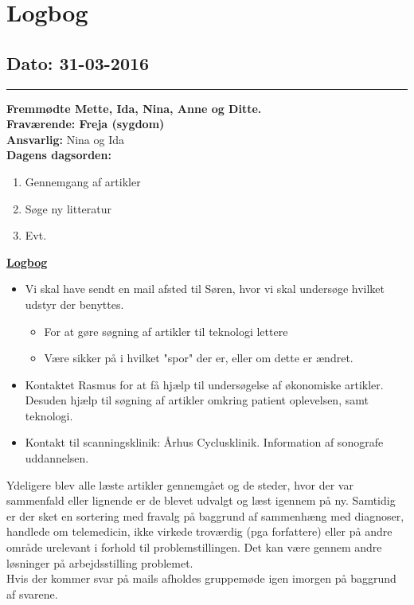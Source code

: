 \chapter{Logbog}
\section{Dato: 31-03-2016}
\hrule
\textbf{Fremmødte Mette, Ida, Nina, Anne og Ditte.} \\
\textbf{Fraværende: Freja (sygdom) } \\
\textbf{Ansvarlig:} Nina og Ida  \\
\textbf{Dagens dagsorden: }
\begin{enumerate}
	\item Gennemgang af artikler
	\item Søge ny litteratur
	\item Evt. 
\end{enumerate}

\underline{\textbf{Logbog}}
\begin{itemize}
\item Vi skal have sendt en mail afsted til Søren, hvor vi skal undersøge hvilket udstyr der benyttes.
\begin{itemize}
\item For at gøre søgning af artikler til teknologi lettere
\item Være sikker på i hvilket "spor" der er, eller om dette er ændret.
\end{itemize}
\item Kontaktet Rasmus for at få hjælp til undersøgelse af økonomiske artikler. Desuden hjælp til søgning af artikler omkring patient oplevelsen, samt teknologi. 
\item Kontakt til scanningsklinik: Århus Cyclusklinik. Information af sonografe uddannelsen. 
\end{itemize}

Ydeligere blev alle læste artikler gennemgået og de steder, hvor der var sammenfald eller lignende er de blevet udvalgt og læst igennem på ny. Samtidig er der sket en sortering med fravalg på baggrund af sammenhæng med diagnoser, handlede om telemedicin, ikke virkede troværdig (pga forfattere) eller på andre område urelevant i forhold til problemstillingen. Det kan være gennem andre løsninger på arbejdsstilling problemet.  \\
\newline
Hvis der kommer svar på mails afholdes gruppemøde igen imorgen på baggrund af svarene. 
\newpage